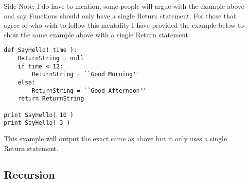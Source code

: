 Side Note: I do have to mention, some people will argue with the example above and say Functions should only have a single Return statement.
For those that agree or who wish to follow this mentality I have provided the example below to show the same example above with a single Return
statement.

\begin{lstlisting}[caption={Single Return Statement}]
def SayHello( time ):
    ReturnString = null
    if time < 12:
        ReturnString = ``Good Morning''
    else:
        ReturnString = ``Good Afternoon''
    return ReturnString

print SayHello( 10 )
print SayHello( 3 )
\end{lstlisting}

This example will output the exact same as above but it only uses a single Return statement.

\subsection{Recursion}

